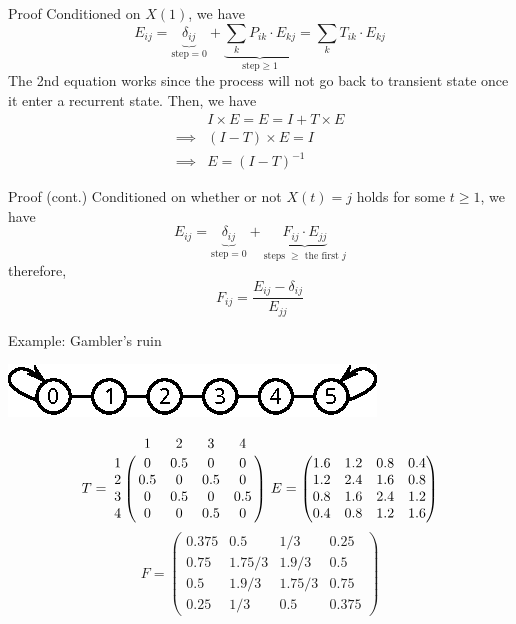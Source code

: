 \documentclass[mathserif]{beamer}
\begin{document}
\begin{frame}{Proof}
Conditioned on $X(1)$, we have
\[
E_{ij} = \underbrace{\delta_{ij}}_{\text{step} = 0} + 
	\underbrace{\sum_k P_{ik} \cdot E_{kj}}_{\text{step} \geq 1}
	= \sum_k T_{ik} \cdot E_{kj}
\]
The 2nd equation works since the process will not go back to transient state once it enter a recurrent state.
Then, we have
\begin{align*}
& I \times E = E = I + T \times E \\
\implies & (I - T) \times E = I \\
\implies & E = (I - T)^{-1}
\end{align*}
\end{frame}

\begin{frame}{Proof (cont.)}
Conditioned on whether or not $X(t) = j$ holds for some $t \geq 1$, we have
\[
E_{ij} = \underbrace{\delta_{ij}}_{\text{step} = 0} + 
	\underbrace{F_{ij} \cdot E_{jj}}_{\text{steps $\geq$ the first $j$}}
\]
therefore,
\[
F_{ij} = \frac{E_{ij} - \delta_{ij}}{E_{jj}}
\]
\end{frame}

\begin{frame}{Example: Gambler's ruin}
\begin{center}
\includegraphics[scale=1.5]{gambler_line}
\end{center}
\[
T = \bordermatrix{~ & 1   & 2   & 3   & 4 \cr
                  1 & 0   & 0.5 & 0   & 0 \cr
                  2 & 0.5 & 0   & 0.5 & 0 \cr
                  3 & 0   & 0.5 & 0   & 0.5 \cr
                  4 & 0   & 0   & 0.5 & 0 \cr}
~E = \begin{pmatrix}
1.6 & 1.2 & 0.8 & 0.4 \\
1.2 & 2.4 & 1.6 & 0.8 \\
0.8 & 1.6 & 2.4 & 1.2 \\
0.4 & 0.8 & 1.2 & 1.6
\end{pmatrix}
\]
\[
F = \begin{pmatrix}
0.375 & 0.5 & 1/3 & 0.25 \\
0.75 & 1.75/3 & 1.9/3 & 0.5 \\
0.5 & 1.9/3 & 1.75/3 & 0.75 \\
0.25 & 1/3 & 0.5 & 0.375
\end{pmatrix}
\]
\end{frame}
\end{document}
